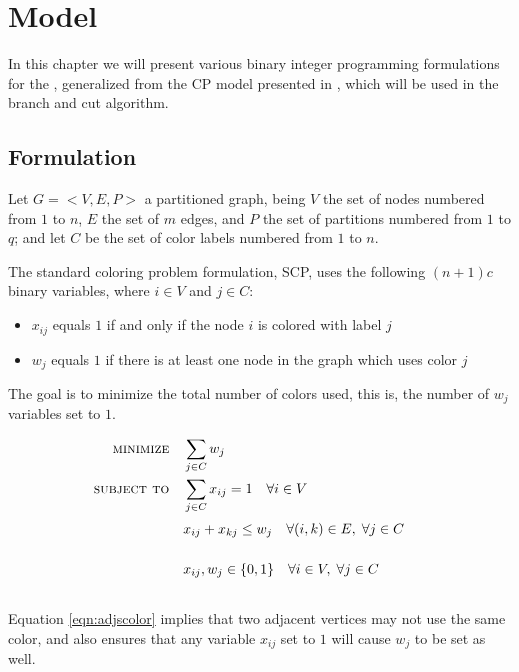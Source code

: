 
\chapter{Model}
\label{sec:model}

In this chapter we will present various binary integer programming formulations for the \PCP{}, generalized from the CP model presented in \cite{mendez2008cutting}, which will be used in the branch and cut algorithm.

\section{Formulation}
\label{subsec:model:formulation}

Let $G = <V,E,P>$ a partitioned graph, being $V$ the set of nodes numbered from $1$ to $n$, $E$ the set of $m$ edges, and $P$ the set of partitions numbered from $1$ to $q$; and let $C$ be the set of color labels numbered from $1$ to $n$.

The standard coloring problem formulation, SCP, uses the following $(n + 1) c$ binary variables, where $i \in V$ and $j \in C$:
\begin{itemize}
\item $x_{ij}$ equals $1$ if and only if the node $i$ is colored with label $j$
\item $w_j$ equals $1$ if there is at least one node in the graph which uses color $j$
\end{itemize}

The goal is to minimize the total number of colors used, this is, the number of $w_j$ variables set to $1$.

\begin{align}
\text{\textsc{minimize}} \quad & \sum_{j \in C} w_j \nonumber \\
\text{\textsc{subject to}} \quad & \sum_{j \in C} x_{ij} = 1 \quad \forall i \in V \label{eqn:vertexsum} \\
& x_{ij} + x_{kj} \leq w_j \quad \forall (i,k) \in E, \; \forall j \in C \sumheight \label{eqn:adjscolor}\\
& x_{ij}, w_{j} \in \{0,1\} \quad \forall i \in V, \; \forall j \in C \sumheight \nonumber
\end{align}

Equation \ref{eqn:adjscolor} implies that two adjacent vertices may not use the same color, and also ensures that any variable $x_{ij}$ set to $1$ will cause $w_j$ to be set as well.

